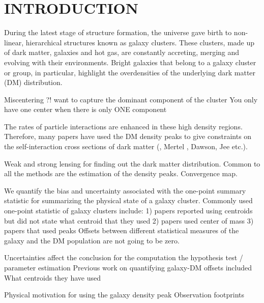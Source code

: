 
\section{INTRODUCTION} 
During the latest stage of structure formation, the universe gave birth to
non-linear, hierarchical structures known as galaxy clusters. 
These clusters, made up of dark matter, galaxies and hot gas,
are constantly accreting, merging and evolving with their
environments. Bright galaxies that belong to a galaxy cluster or group, in particular, 
highlight the overdensities of the underlying dark matter (DM) distribution. 

Miscentering ?! want to capture the dominant component of the cluster 
You only have one center when there is only ONE component 

The rates of particle interactions are enhanced in these high density regions.
Therefore, many papers have used the DM density peaks to give constraints on 
the self-interaction cross
sections of dark matter (\citealt{Markevitch2003}, Mertel , Dawson, Jee etc.). 

 


Weak and strong lensing for finding out the dark matter distribution. 
Common to all the methods are the estimation of the density peaks. 
Convergence map.  




We quantify the bias and uncertainty associated with the one-point summary
statistic for summarizing the physical state of a galaxy cluster. 
Commonly used one-point statistic of galaxy clusters include:
1) papers reported using centroids but did not state what centroid that they
used 
2) papers used center of mass 
3) papers that used peaks  
Offsets between different statistical measures of the galaxy and the DM
population are not going to be zero.

Uncertainties affect the conclusion for the computation the hypothesis test / parameter
estimation
Previous work on quantifying galaxy-DM offsets included  
What centroids they have used

Physical motivation for using the galaxy density peak 
Observation footprints 

